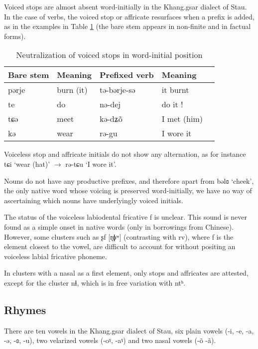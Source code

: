 \documentclass[oneside,a4paper,11pt]{article}
\newcommand{\ipa}[1]{{\phon #1}} %
\begin{document}
Voiced stops are almost absent word-initially in the Khang.gsar dialect of Stau. In the case of verbs, the voiced stop or affricate resurfaces when a prefix is added, as in the examples in Table \ref{tab:voiced} (the bare stem appears in non-finite and in factual forms).

 \begin{table}[H]
 \caption{Neutralization of voiced stops in word-initial position} \label{tab:voiced} \centering 
\begin{tabular}{lllll}
\toprule
Bare stem & Meaning & Prefixed verb & Meaning \\
\midrule
\ipa{pərje} & burn (it) &\ipa{tə-bərje-sə} & it burnt \\
\ipa{te} & do &\ipa{nə-dej} & do it !\\
\ipa{tɕə} & meet &\ipa{kə-dʑõ} & I met (him)\\
\ipa{kə} &wear &\ipa{rə-gu} & I wore it \\
\bottomrule
\end{tabular}
\end{table}
Voiceless stop and affricate initials do not show any alternation, as for instance \ipa{tɕi} `wear (hat)' $\rightarrow$ \ipa{rə-tɕu} `I wore it'.

Nouns do not have any productive prefixes, and therefore apart from \ipa{bəlɞ} `cheek', the only native word whose voicing is preserved word-initially, we have no way of ascertaining which nouns have underlyingly voiced initials.

 
The status of the voiceless labiodental fricative \ipa{f} is unclear. This sound is never found as a simple onset in native words (only in borrowings from Chinese). However, some clusters such as  \ipa{ʂf} [\ipa{r̥ɸʷ}] (contrasting with \ipa{rv}), where \ipa{f} is the element closest to the vowel, are difficult to account for without positing an voiceless labial fricative phoneme.
 
 In clusters with a nasal as a first element, only stops and affricates are attested, except for the cluster \ipa{nɬ}, which is in free variation with \ipa{ntʰ}.
 
  \subsection{Rhymes}
 
There are ten vowels in the Khang.gsar dialect of Stau, six plain vowels (-\ipa{i}, -\ipa{e}, -\ipa{a}, -\ipa{ə}, -\ipa{ɞ},  -\ipa{u}), two velarized vowels (-\ipa{oˠ}, -\ipa{aˠ}) and two nasal vowels (-\ipa{õ}   -\ipa{ã}).
\end{document}
